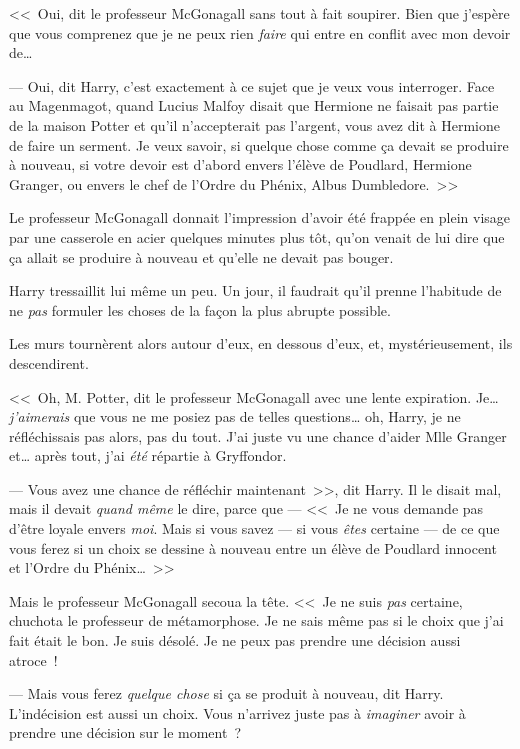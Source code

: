 <<~Oui, dit le professeur McGonagall sans tout à fait soupirer. Bien que j'espère que vous comprenez que je ne peux rien \emph{faire} qui entre en conflit avec mon devoir de…

--- Oui, dit Harry, c'est exactement à ce sujet que je veux vous interroger. Face au Magenmagot, quand Lucius Malfoy disait que Hermione ne faisait pas partie de la maison Potter et qu'il n'accepterait pas l'argent, vous avez dit à Hermione de faire un serment. Je veux savoir, si quelque chose comme ça devait se produire à nouveau, si votre devoir est d'abord envers l'élève de Poudlard, Hermione Granger, ou envers le chef de l'Ordre du Phénix, Albus Dumbledore.~>>

Le professeur McGonagall donnait l'impression d'avoir été frappée en plein visage par une casserole en acier quelques minutes plus tôt, qu'on venait de lui dire que ça allait se produire à nouveau et qu'elle ne devait pas bouger.

Harry tressaillit lui même un peu. Un jour, il faudrait qu'il prenne l'habitude de ne \emph{pas} formuler les choses de la façon la plus abrupte possible.

Les murs tournèrent alors autour d'eux, en dessous d'eux, et, mystérieusement, ils descendirent.

<<~Oh, M. Potter, dit le professeur McGonagall avec une lente expiration. Je… \emph{j'aimerais} que vous ne me posiez pas de telles questions… oh, Harry, je ne réfléchissais pas alors, pas du tout. J'ai juste vu une chance d'aider Mlle Granger et… après tout, j'ai \emph{été} répartie à Gryffondor.

--- Vous avez une chance de réfléchir maintenant~>>, dit Harry. Il le disait mal, mais il devait \emph{quand même} le dire, parce que — <<~Je ne vous demande pas d'être loyale envers \emph{moi}. Mais si vous savez — si vous \emph{êtes} certaine — de ce que vous ferez si un choix se dessine à nouveau entre un élève de Poudlard innocent et l'Ordre du Phénix…~>>

Mais le professeur McGonagall secoua la tête. <<~Je ne suis \emph{pas} certaine, chuchota le professeur de métamorphose. Je ne sais même pas si le choix que j'ai fait était le bon. Je suis désolé. Je ne peux pas prendre une décision aussi atroce~!

--- Mais vous ferez \emph{quelque chose} si ça se produit à nouveau, dit Harry. L'indécision est aussi un choix. Vous n'arrivez juste pas à \emph{imaginer} avoir à prendre une décision sur le moment~?

